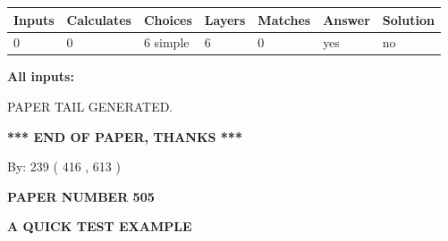 \documentclass[12pt]{article}
\begin{document}
 
\noindent{}
 
 
   
   
   
   
\noindent\begin{tabular}{|l|l|l|l|l|l|l|}
 \hline
Inputs & Calculates & Choices & Layers & Matches & Answer & Solution \\ \hline
 0  & 
 0  & 
 6
  simple  
  & 
 6  & 
 0  & 
  yes & 
  no 
  \\ \hline
 \end{tabular}
   
   
   
   
\noindent{}
   
   
   
   
\noindent\vspace{0.1in}\hspace{-0.08in} {\textbf{\Large{All inputs: }}}
   
   
   
   
   
   
 \vspace{0.2in}
 
   
   
\vspace{2.0in} PAPER TAIL GENERATED.
   
   
   
   
\vspace{1.0in} 
{\textbf{\large{ *** END OF PAPER, THANKS *** }}} 
   
   
\hspace{1.0in} By: 
 239 ( 416 ,  613 )
   
   
   
   
\newpage 
\setcounter{page}{ 
   505001 } 
   
   
   
   
 {\textbf{ \Large{ PAPER NUMBER  505  }}}
   
   
\vspace{0.2in}
   
   
   
   
   
   
   
   
 \vspace{0.2in}
{\LARGE {\textbf{ A QUICK TEST EXAMPLE}}}
   
\end{document}

